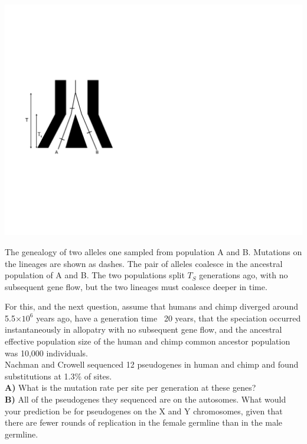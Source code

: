 \begin{marginfigure}
\begin{center}
\includegraphics[width=0.8 \textwidth]{figures/Genetic_drift/ILS/split_anc_pop.pdf}
\end{center}
\caption{The genealogy of two alleles one sampled from population A and B. Mutations on the lineages are shown as dashes. The pair of alleles coalesce in the ancestral population of A and B. The two populations split $T_S$ generations ago, with no subsequent gene flow, but the two lineages must coalesce deeper in time. } \label{fig:split_anc_pop}  
\end{marginfigure} 





\begin{question}
For this, and the next question, assume that humans and chimp diverged
around 5.5$\times 10^6$ years ago, have a generation time ~20 years, that the speciation occurred instantaneously in allopatry with no subsequent gene flow, and the ancestral effective population size of the human and chimp common ancestor population was 10,000 individuals.\\
Nachman and Crowell sequenced 12 pseudogenes in human and chimp and found substitutions at 1.3\% of sites. \\
{\bf A) } What is the mutation rate per site per generation at these genes?\\
{\bf B)} All of the pseudogenes they sequenced are on the autosomes. What
would your prediction be for pseudogenes on the X and Y chromosomes,
given that there are fewer rounds of replication in the female
germline than in the male germline.
\end{question}

